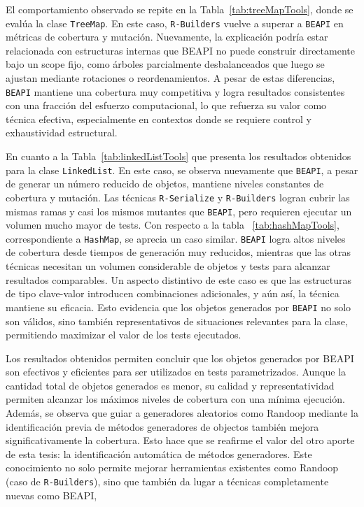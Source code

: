 El comportamiento observado se repite en la Tabla~\ref{tab:treeMapTools}, donde se evalúa la 
clase \texttt{TreeMap}. En este caso, \texttt{R-Builders} vuelve a superar a \texttt{BEAPI} 
en métricas de cobertura y mutación. Nuevamente, la explicación podría estar relacionada con 
estructuras internas que BEAPI no puede construir directamente bajo un scope fijo, como 
árboles parcialmente desbalanceados que luego se ajustan mediante rotaciones o reordenamientos. 
A pesar de estas diferencias, \texttt{BEAPI} mantiene una cobertura muy competitiva y logra 
resultados consistentes con una fracción del esfuerzo computacional, lo que refuerza su valor 
como técnica efectiva, especialmente en contextos donde se requiere control y exhaustividad 
estructural.

En cuanto a la Tabla~\ref{tab:linkedListTools} que presenta los resultados obtenidos para la clase 
\texttt{LinkedList}. En este caso, se observa nuevamente que \texttt{BEAPI}, a pesar de 
generar un número reducido de objetos, mantiene niveles constantes de cobertura y mutación. 
Las técnicas \texttt{R-Serialize} y \texttt{R-Builders} logran cubrir las mismas ramas y casi los mismos 
mutantes que \texttt{BEAPI}, pero requieren ejecutar un volumen mucho mayor de tests. Con respecto a la tabla ~\ref{tab:hashMapTools}, 
correspondiente a \texttt{HashMap}, se aprecia un caso 
similar. \texttt{BEAPI} logra altos niveles de cobertura desde tiempos de generación muy 
reducidos, mientras que las otras técnicas necesitan un volumen considerable de objetos y 
tests para alcanzar resultados comparables. Un aspecto distintivo de este caso es que las 
estructuras de tipo clave-valor introducen combinaciones adicionales, y aún así, la técnica 
mantiene su eficacia. Esto evidencia que los objetos generados por \texttt{BEAPI} no solo son 
válidos, sino también representativos de situaciones relevantes para la clase, permitiendo 
maximizar el valor de los tests ejecutados.

Los resultados obtenidos permiten concluir que los objetos generados por \textsf{BEAPI} son 
efectivos y eficientes para ser utilizados en tests parametrizados. Aunque la cantidad total de 
objetos generados es menor, su calidad y representatividad permiten alcanzar los máximos niveles 
de cobertura con una mínima ejecución. Además, se observa que guiar a generadores aleatorios como 
Randoop mediante la identificación previa de métodos generadores de objectos también mejora significativamente 
la cobertura. Esto hace que se reafirme el valor del otro aporte de esta tesis: la identificación automática de métodos generadores.
Este conocimiento no solo permite mejorar herramientas existentes como Randoop (caso de \texttt{R-Builders}), 
sino que también da lugar a técnicas completamente nuevas como \textsf{BEAPI}, 

